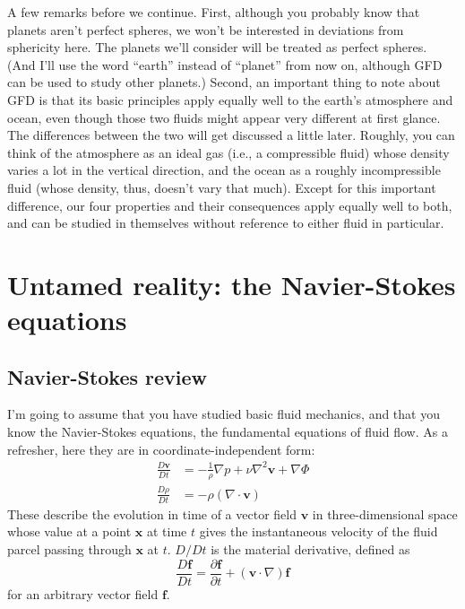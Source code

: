 \documentclass[11pt]{book}
\begin{document}
A few remarks before we continue.  First, although you probably know that planets aren't perfect spheres, we won't be interested in deviations from sphericity here.  The planets we'll consider will be treated as perfect spheres.  (And I'll use the word ``earth'' instead of ``planet'' from now on, although GFD can be used to study other planets.)  Second, an important thing to note about GFD is that its basic principles apply equally well to the earth's atmosphere and ocean, even though those two fluids might appear very different at first glance.  The differences between the two will get discussed a little later.  Roughly, you can think of the atmosphere as an ideal gas (i.e., a compressible fluid) whose density varies a lot in the vertical direction, and the ocean as a roughly incompressible fluid (whose density, thus, doesn't vary that much).  Except for this important difference, our four properties and their consequences apply equally well to both, and can be studied in themselves without reference to either fluid in particular.

\section{Untamed reality: the Navier-Stokes equations}
\subsection{Navier-Stokes review}
I'm going to assume that you have studied basic fluid mechanics, and that you know the Navier-Stokes equations, the fundamental equations of fluid flow.  As a refresher, here they are in coordinate-independent form:
\begin{align}\frac{D\mathbf{v}}{Dt} &= -\frac{1}{\rho}\nabla{p} + \nu\nabla^2 \mathbf{v} + \nabla \Phi\label{NSmom} \\ \frac{D\rho}{Dt} &= -\rho(\nabla \cdot \mathbf{v}) \label{NScont}\end{align}
These describe the evolution in time of a vector field $\mathbf{v}$ in three-dimensional space whose value at a point $\mathbf{x}$ at time $t$ gives the instantaneous velocity of the fluid parcel passing through $\mathbf{x}$ at $t$.  $D/Dt$ is the material derivative, defined as
\begin{equation}\frac{D\mathbf{f}}{Dt} = \frac{\partial \mathbf{f}}{\partial t} + (\mathbf{v} \cdot \nabla)\mathbf{f}\end{equation} for an arbitrary vector field $\mathbf{f}$.
\end{document}
